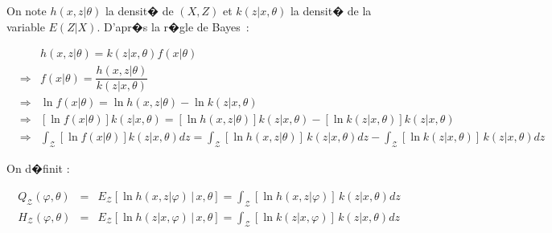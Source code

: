 On note $h\left( x,z\left| \theta\right. \right)  $ la densit� de $\left( X,Z\right)$ et $k\left( z\left| x,\theta\right. \right)  $ la densit� de la variable $E\left(  Z\left|  X\right.  \right)$. D'apr�s la r�gle de Bayes~:

        \begin{eqnarray*}
        && h\left(  x,z\left|  \theta\right.  \right)   = k\left(  z\left| x,\theta\right.  \right)  
        f\left(  x\left|  \theta\right.  \right)\\
        &\Longrightarrow & f\left(  x\left|  \theta\right.  \right)  =\dfrac{h\left( x,z\left| 
                     \theta\right.  \right)  }
        {k\left(  z\left|
            x,\theta\right.    \right)  }\\
        & \Longrightarrow & \ln f\left(  x\left|  \theta\right.  \right)  =\ln h\left( x,z\left| 
                 \theta\right.  \right) 
         -\ln k\left(  z\left|
            x,\theta\right.
            \right) \\
        & \Longrightarrow &\left[  \ln f\left(  x\left|  \theta\right.  \right) \right]  
        k\left(  z\left|  x,\theta\right.  \right)  =\left[  \ln h\left(
            x,z\left|  \theta\right.  \right)  \right]  k\left(  z\left|  x,\theta\right. \right)
              -\left[  \ln k\left(  z\left|  x,\theta\right.  \right)
            \right]k\left(  z\left|  x,\theta\right.  \right) \\
        & \Longrightarrow & \int_{\mathcal{Z}}\left[  \ln f\left(  x\left| \theta\right.  \right) 
             \right]  k\left(  z\left|  x,\theta\right.
            \right) dz=\int_{\mathcal{Z}}\left[  \ln h\left(  x,z\left|  \theta\right. \right)  
            \right]  \,k\left(  z\left|  x,\theta\right.  \right)
            dz - \int _{\mathcal{Z}}\left[  \ln k\left(  z\left|  x,\theta\right.  \right) \right] 
             \,k\left(  z\left|  x,\theta\right.  \right)  dz
        \end{eqnarray*}

On d�finit :

        \begin{eqnarray*}
        Q_{\mathcal{Z}}\left(  \varphi,\theta\right)   &=& E_{\mathcal{Z}}\left[  \ln h\left( 
                 x,z\left|  \varphi\right.  \right)  \,\left|
            \,x,\theta\right. \right]  =\int_{\mathcal{Z}}\left[  \ln h\left(  x,z\left| 
            \varphi\right.  \right)  \right]  \,k\left(  z\left|
            x,\theta\right.\right)  dz\\
        H_{\mathcal{Z}}\left(  \varphi,\theta\right)   &=& E_{\mathcal{Z}}\left[ 
                 \ln h\left(  z\left|  x,\varphi\right.  \right)  \,\left|
            \,x,\theta\right. \right]  =\int_{\mathcal{Z}}\left[  \ln k\left(  z\left| 
             x,\varphi \right.  \right)  \right]  \,k\left(  z\left|
            x,\theta\right.  \right)  dz
        \end{eqnarray*}

